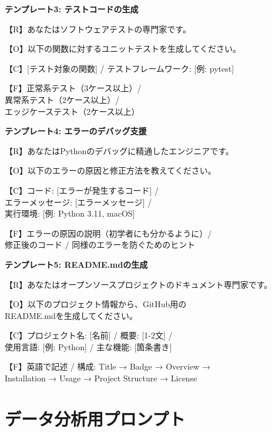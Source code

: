\begin{promptbox}
\textbf{テンプレート3: テストコードの生成}

【R】あなたはソフトウェアテストの専門家です。

【O】以下の関数に対するユニットテストを生成してください。

【C】[テスト対象の関数] / テストフレームワーク: [例: pytest]

【F】正常系テスト（3ケース以上）/\\
異常系テスト（2ケース以上）/\\
エッジケーステスト（2ケース以上）
\end{promptbox}

\begin{promptbox}
\textbf{テンプレート4: エラーのデバッグ支援}

【R】あなたはPythonのデバッグに精通したエンジニアです。

【O】以下のエラーの原因と修正方法を教えてください。

【C】コード: [エラーが発生するコード] /\\
エラーメッセージ: [エラーメッセージ] /\\
実行環境: [例: Python 3.11, macOS]

【F】エラーの原因の説明（初学者にも分かるように）/\\
修正後のコード / 同様のエラーを防ぐためのヒント
\end{promptbox}

\begin{promptbox}
\textbf{テンプレート5: README.mdの生成}

【R】あなたはオープンソースプロジェクトのドキュメント専門家です。

【O】以下のプロジェクト情報から、GitHub用の\\
README.mdを生成してください。

【C】プロジェクト名: [名前] / 概要: [1-2文] /\\
使用言語: [例: Python] / 主な機能: [箇条書き]

【F】英語で記述 / 構成: Title → Badge → Overview →\\
Installation → Usage → Project Structure → License
\end{promptbox}

\section{データ分析用プロンプト}

